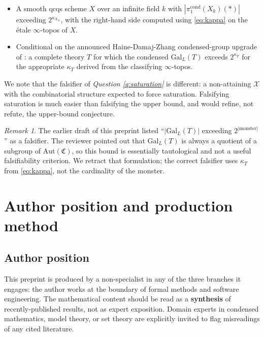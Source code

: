 \documentclass[11pt]{article}
\theoremstyle{definition}
\theoremstyle{plain}
\theoremstyle{remark}
\newtheorem*{remark}{Remark}
\newcommand{\GalL}{\mathrm{Gal}_{L}}
\begin{document}
\begin{itemize}
\item A smooth qcqs scheme $X$ over an infinite field $k$ with
$|\pi_1^{\mathrm{cond}}(X_k)(\ast)|$ exceeding $2^{\kappa_{X_{\mathrm{\acute{e}t}}}}$,
with the right-hand side computed using \eqref{eq:kappa} on the \'etale
$\infty$-topos of $X$.
\item Conditional on the announced Haine-Damaj-Zhang condensed-group upgrade
of \cite{CampionCousinsYe2021}: a complete theory $T$ for which the condensed
$\GalL(T)$ exceeds $2^{\kappa_{T}}$ for the appropriate $\kappa_T$ derived
from the classifying $\infty$-topos.
\end{itemize}

We note that the falsifier of \emph{Question \ref{q:saturation}} is
different: a non-attaining $\mathcal X$ with the combinatorial structure
expected to force saturation. Falsifying saturation is much easier than
falsifying the upper bound, and would refine, not refute, the upper-bound
conjecture.

\begin{remark}
The earlier draft of this preprint listed
``$|\GalL(T)|$ exceeding $2^{|\mathrm{monster}|}$'' as a falsifier. The
reviewer pointed out that $\GalL(T)$ is always a quotient of a subgroup of
$\mathrm{Aut}(\mathfrak C)$, so this bound is essentially tautological and
not a useful falsifiability criterion. We retract that formulation; the
correct falsifier uses $\kappa_T$ from \eqref{eq:kappa}, not the cardinality
of the monster.
\end{remark}

\section{Author position and production method}\label{sec:method}

\subsection{Author position}

This preprint is produced by a non-specialist in any of the three branches
it engages: the author works at the boundary of formal methods and software
engineering. The mathematical content should be read as a \textbf{synthesis}
of recently-published results, not as expert exposition. Domain experts in
condensed mathematics, model theory, or set theory are explicitly invited to
flag misreadings of any cited literature.
\end{document}
